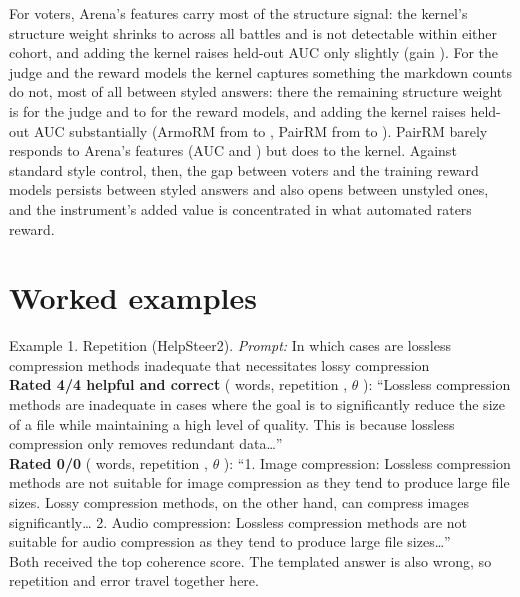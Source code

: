 \documentclass[11pt]{article}
\begin{document}
For voters, Arena's features carry most of the structure signal: the kernel's structure weight shrinks to \sbVAll{} across all battles and is not detectable within either cohort, and adding the kernel raises held-out AUC only slightly (gain \sbVAllGainCI). For the judge and the reward models the kernel captures something the markdown counts do not, most of all between styled answers: there the remaining structure weight is \sbJB{} for the judge and \sbGB{} to \sbAB{} for the reward models, and adding the kernel raises held-out AUC substantially (ArmoRM from \sbABAucSC{} to \sbABAucSCK, PairRM from \sbPBAucSC{} to \sbPBAucSCK). PairRM barely responds to Arena's features (AUC \sbPNAucSC{} and \sbPBAucSC) but does to the kernel. Against standard style control, then, the gap between voters and the training reward models persists between styled answers and also opens between unstyled ones, and the instrument's added value is concentrated in what automated raters reward.

\section{Worked examples}\label{sec:examples}
\begin{example}{Example 1. Repetition (HelpSteer2).}
\textit{Prompt:} In which cases are lossless compression methods inadequate that necessitates lossy compression\\[2pt]
\textbf{Rated 4/4 helpful and correct} (\exOneTokA{} words, repetition \exOneRepA, $\theta$ \exOneThetaA): ``Lossless compression methods are inadequate in cases where the goal is to significantly reduce the size of a file while maintaining a high level of quality. This is because lossless compression only removes redundant data\ldots''\\[2pt]
\textbf{Rated 0/0} (\exOneTokB{} words, repetition \exOneRepB, $\theta$ \exOneThetaB): ``1. Image compression: Lossless compression methods are not suitable for image compression as they tend to produce large file sizes. Lossy compression methods, on the other hand, can compress images significantly\ldots{} 2. Audio compression: Lossless compression methods are not suitable for audio compression as they tend to produce large file sizes\ldots''\\[2pt]
Both received the top coherence score. The templated answer is also wrong, so repetition and error travel together here.
\end{example}
\end{document}
